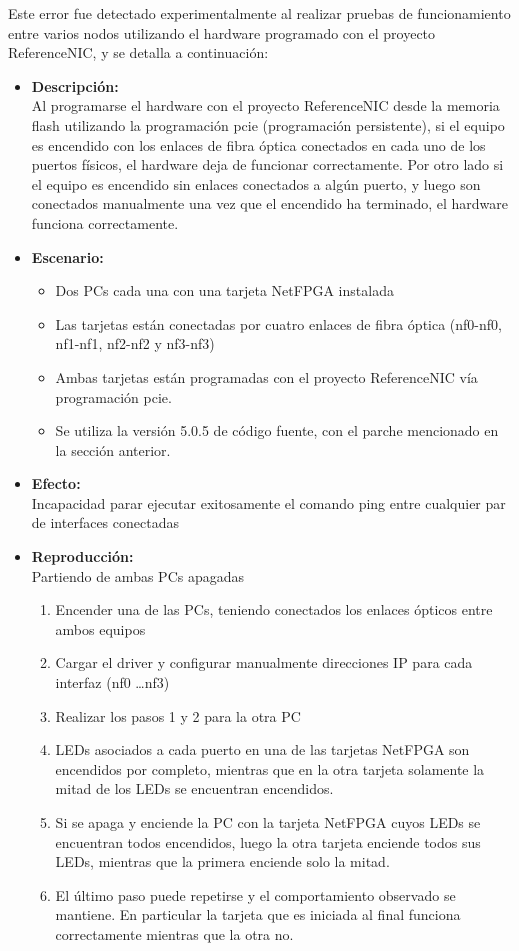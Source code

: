 Este error fue detectado experimentalmente al realizar pruebas de funcionamiento entre varios nodos utilizando el hardware programado con el proyecto ReferenceNIC, y se detalla a continuaci\'on:

\begin{itemize}
\item \textbf{Descripci\'on:}\\
Al programarse el hardware con el proyecto ReferenceNIC desde la memoria flash utilizando la programaci\'on pcie (programación persistente), si el equipo es encendido con los enlaces de fibra óptica conectados en cada uno de los puertos físicos, el hardware deja de funcionar correctamente. Por otro lado si el equipo es encendido sin enlaces conectados a algún puerto, y luego son conectados manualmente una vez que el encendido ha terminado, el hardware funciona correctamente.

\item \textbf{Escenario:}
\begin{itemize}
\item Dos PCs cada una con una tarjeta NetFPGA instalada
\item Las tarjetas están conectadas por cuatro enlaces de fibra \'optica (nf0-nf0, nf1-nf1, nf2-nf2 y nf3-nf3)
\item Ambas tarjetas están programadas con el proyecto ReferenceNIC vía programaci\'on pcie.
\item Se utiliza la versi\'on 5.0.5 de c\'odigo fuente, con el parche mencionado en la sección anterior.
\end{itemize}

\item \textbf{Efecto:}\\
Incapacidad parar ejecutar exitosamente el comando ping entre cualquier par de interfaces conectadas

\item \textbf{Reproducci\'on:}\\
Partiendo de ambas PCs apagadas
\begin{enumerate}
\item Encender una de las PCs, teniendo conectados los enlaces \'opticos entre ambos equipos
\item Cargar el driver y configurar manualmente direcciones IP para cada interfaz (nf0 \dots nf3)
\item Realizar los pasos 1 y 2 para la otra PC
\item LEDs asociados a cada puerto en una de las tarjetas NetFPGA son encendidos por completo, mientras que en la otra tarjeta solamente la mitad de los LEDs se encuentran encendidos.
\item Si se apaga y enciende la PC con la tarjeta NetFPGA cuyos LEDs se encuentran todos encendidos, luego la otra tarjeta enciende todos sus LEDs, mientras que la primera enciende solo la mitad.
\item El \'ultimo paso puede repetirse y el comportamiento observado se mantiene. En particular la tarjeta que es iniciada al final funciona correctamente mientras que la otra no.
\end{enumerate} 


\end{itemize}
